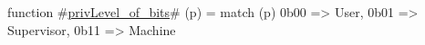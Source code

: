 function #\hyperref[sailRISCVzprivLevelzyofzybits]{privLevel\_of\_bits}# (p) =
  match (p) {
    0b00 => User,
    0b01 => Supervisor,
    0b11 => Machine
  }
